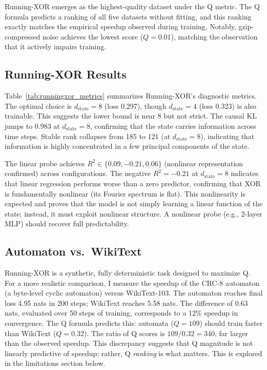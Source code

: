\documentclass{article}
\begin{document}
Running-XOR emerges as the highest-quality dataset under the Q metric. The Q formula predicts a ranking of all five datasets without fitting, and this ranking exactly matches the empirical speedup observed during training. Notably, gzip-compressed noise achieves the lowest score ($Q = 0.01$), matching the observation that it actively impairs training.

\subsection{Running-XOR Results}

Table~\ref{tab:runningxor_metrics} summarizes Running-XOR's diagnostic metrics. The optimal choice is $d_{\mathrm{state}} = 8$ (loss 0.297), though $d_{\mathrm{state}} = 4$ (loss 0.323) is also trainable. This suggests the lower bound is near 8 but not strict. The causal KL jumps to 0.983 at $d_{\mathrm{state}} = 8$, confirming that the state carries information across time steps. Stable rank collapses from 185 to 121 (at $d_{\mathrm{state}} = 8$), indicating that information is highly concentrated in a few principal components of the state.

The linear probe achieves $R^2 \in \{0.09, -0.21, 0.06\}$ (nonlinear representation confirmed) across configurations. The negative $R^2 = -0.21$ at $d_{\mathrm{state}} = 8$ indicates that linear regression performs worse than a zero predictor, confirming that XOR is fundamentally nonlinear (its Fourier spectrum is flat). This nonlinearity is expected and proves that the model is not simply learning a linear function of the state; instead, it must exploit nonlinear structure. A nonlinear probe (e.g., 2-layer MLP) should recover full predictability.

\subsection{Automaton vs.\ WikiText}

Running-XOR is a synthetic, fully deterministic task designed to maximize Q. For a more realistic comparison, I measure the speedup of the CRC-8 automaton (a byte-level cyclic automaton) versus WikiText-103. The automaton reaches final loss 4.95 nats in 200 steps; WikiText reaches 5.58 nats. The difference of 0.63 nats, evaluated over 50 steps of training, corresponds to a 12\% speedup in convergence. The Q formula predicts this: automata ($Q = 109$) should train faster than WikiText ($Q = 0.32$). The ratio of Q scores is $109 / 0.32 = 340$, far larger than the observed speedup. This discrepancy suggests that Q magnitude is not linearly predictive of speedup; rather, Q \emph{ranking} is what matters. This is explored in the limitations section below.
\end{document}

